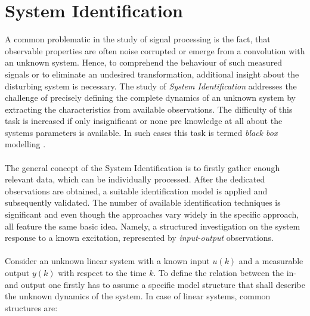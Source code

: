 \documentclass[english]{isasthesis}
\begin{document}
	 \section{System Identification}
	 A common problematic in the study of signal processing is the fact, that observable properties are often noise corrupted or emerge from a convolution with an unknown system. Hence, to comprehend the behaviour of such measured signals or to eliminate an undesired transformation, additional insight about the disturbing system is  necessary. The study of \textit{System Identification} addresses the challenge of precisely defining the complete dynamics of an unknown system by extracting the characteristics from available observations. The difficulty of this task is increased if only insignificant or none pre knowledge at all about the systems parameters is available. In such cases this task is termed \textit{black box} modelling \cite{sid}.\\ \\
	 The general concept of the System Identification is to firstly gather enough relevant data, which can be individually processed. After the dedicated observations are obtained, a suitable identification model is applied and subsequently validated. The number of available identification techniques is significant and even though the approaches vary widely in the specific approach, all feature the same basic idea. Namely, a structured investigation on the system response to a known excitation, represented by \textit{input}-\textit{output} observations. \\ \\
    	Consider an unknown linear system with a known input $u(k)$ and a measurable output $y(k)$ with respect to the time $k$. To define the relation between the in- and output one firstly has to assume a specific model structure that shall describe the unknown dynamics of the system. In case of linear systems, common structures are:
\end{document}
